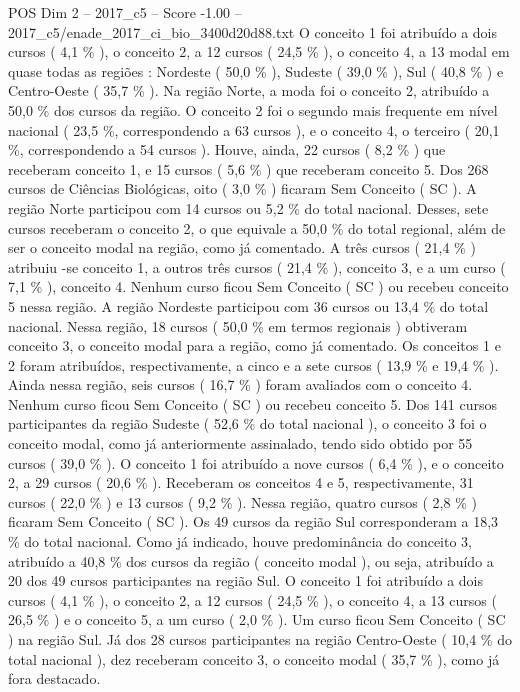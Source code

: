 \begin{textsample}{POS Dim 2 – 2017\_c5 – Score -1.00 – 2017\_c5/enade\_2017\_ci\_bio\_3400d20d88.txt}
O conceito 1 foi atribuído a dois cursos ( 4,1 \% ), o conceito 2, a 12 cursos ( 24,5 \% ), o conceito 4, a 13 modal em quase todas as regiões : Nordeste ( 50,0 \% ), Sudeste ( 39,0 \% ), Sul ( 40,8 \% ) e Centro-Oeste ( 35,7 \% ).
Na região Norte, a moda foi o conceito 2, atribuído a 50,0 \% dos cursos da região.
O conceito 2 foi o segundo mais frequente em nível nacional ( 23,5 \%, correspondendo a 63 cursos ), e o conceito 4, o terceiro ( 20,1 \%, correspondendo a 54 cursos ).
Houve, ainda, 22 cursos ( 8,2 \% ) que receberam conceito 1, e 15 cursos ( 5,6 \% ) que receberam conceito 5.
Dos 268 cursos de Ciências Biológicas, oito ( 3,0 \% ) ficaram Sem Conceito ( SC ).
A região Norte participou com 14 cursos ou 5,2 \% do total nacional.
Desses, sete cursos receberam o conceito 2, o que equivale a 50,0 \% do total regional, além de ser o conceito modal na região, como já comentado.
A três cursos ( 21,4 \% ) atribuiu -se conceito 1, a outros três cursos ( 21,4 \% ), conceito 3, e a um curso ( 7,1 \% ), conceito 4.
Nenhum curso ficou Sem Conceito ( SC ) ou recebeu conceito 5 nessa região.
A região Nordeste participou com 36 cursos ou 13,4 \% do total nacional.
Nessa região, 18 cursos ( 50,0 \% em termos regionais ) obtiveram conceito 3, o conceito modal para a região, como já comentado.
Os conceitos 1 e 2 foram atribuídos, respectivamente, a cinco e a sete cursos ( 13,9 \% e 19,4 \% ).
Ainda nessa região, seis cursos ( 16,7 \% ) foram avaliados com o conceito 4.
Nenhum curso ficou Sem Conceito ( SC ) ou recebeu conceito 5.
Dos 141 cursos participantes da região Sudeste ( 52,6 \% do total nacional ), o conceito 3 foi o conceito modal, como já anteriormente assinalado, tendo sido obtido por 55 cursos ( 39,0 \% ).
O conceito 1 foi atribuído a nove cursos ( 6,4 \% ), e o conceito 2, a 29 cursos ( 20,6 \% ).
Receberam os conceitos 4 e 5, respectivamente, 31 cursos ( 22,0 \% ) e 13 cursos ( 9,2 \% ).
Nessa região, quatro cursos ( 2,8 \% ) ficaram Sem Conceito ( SC ).
Os 49 cursos da região Sul corresponderam a 18,3 \% do total nacional.
Como já indicado, houve predominância do conceito 3, atribuído a 40,8 \% dos cursos da região ( conceito modal ), ou seja, atribuído a 20 dos 49 cursos participantes na região Sul.
O conceito 1 foi atribuído a dois cursos ( 4,1 \% ), o conceito 2, a 12 cursos ( 24,5 \% ), o conceito 4, a 13 cursos ( 26,5 \% ) e o conceito 5, a um curso ( 2,0 \% ).
Um curso ficou Sem Conceito ( SC ) na região Sul.
Já dos 28 cursos participantes na região Centro-Oeste ( 10,4 \% do total nacional ), dez receberam conceito 3, o conceito modal ( 35,7 \% ), como já fora destacado.

\end{textsample}
